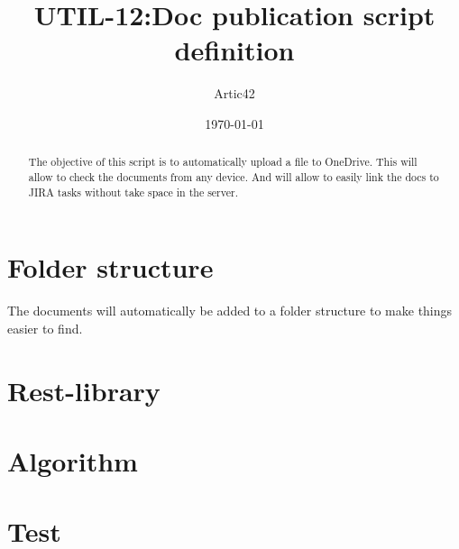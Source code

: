 \def\MYTITLE{UTIL-12:Doc publication script definition}
\def\MYNAME{Artic42}



\usepackage{dirtree}


    \title{\MYTITLE}
    \author{\MYNAME}
    \date{\today}
    \maketitle
    \thispagestyle{firstPage}

    \begin{abstract}
        The objective of this script is to automatically upload a file to OneDrive. This will allow to check the documents from any device. And will allow to easily link the docs to JIRA tasks without take space in the server.
    \end{abstract}

    \section{Folder structure}
    The documents will automatically be added to a folder structure to make things easier to find.
    \vspace{12pt}
    \renewcommand{\baselinestretch}{1.3}
    \renewcommand{\baselinestretch}{1}
    \section{Rest-library}
    \section{Algorithm}

    \section{Test}
